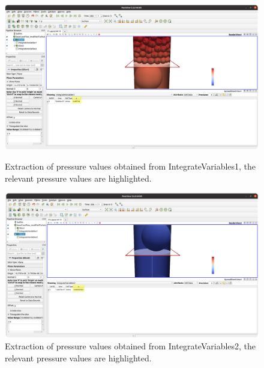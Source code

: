 \begin{figure}
	\includegraphics[width=\linewidth]{Figures/visualisation/caseA/IntegrateVariables1_CaseA_White_highlighted.png}
	\caption{Extraction of pressure values obtained from IntegrateVariables1, the relevant pressure values are highlighted.}
	\label{fig:IntegrateVariables1_CaseA_White}
	
	\includegraphics[width=\linewidth]{Figures/visualisation/caseA/IntegrateVariables2_CaseA_White_highlighted.png}
	\caption{Extraction of pressure values obtained from IntegrateVariables2, the relevant pressure values are highlighted.}
	\label{fig:IntegrateVariables2_CaseA_White}
\end{figure}
\cleardoublepage

